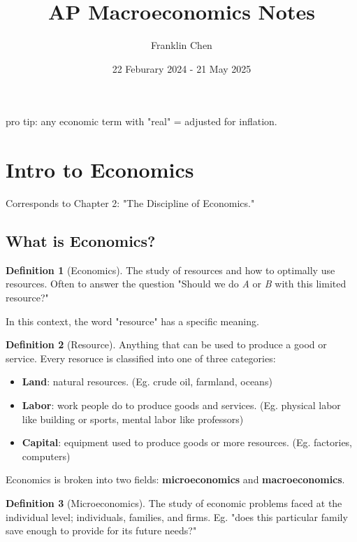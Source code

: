 \documentclass[12pt, a4paper]{article}
\title{AP Macroeconomics Notes}
\author{Franklin Chen}
\date{22 Feburary 2024 - 21 May 2025}
\theoremstyle{definition}
\newtheorem{definition}{Definition}
\begin{document}
\maketitle
\newpage

\tableofcontents

\newpage

pro tip: any economic term with "real" = adjusted for inflation.

\section{Intro to Economics}
Corresponds to Chapter 2: "The Discipline of Economics."

\subsection{What is Economics?}

\begin{definition}[Economics]
    The study of resources and how to optimally use resources.
    Often to answer the question "Should we do \textit{A} or \textit{B} with this limited resource?"
\end{definition}

In this context, the word "resource" has a specific meaning.

\begin{definition}[Resource]
    Anything that can be used to produce a good or service.
    Every resoruce is classified into one of three categories:
    \begin{itemize}
        \item \textbf{Land}: natural resources. (Eg. crude oil, farmland, oceans)
        \item \textbf{Labor}: work people do to produce goods and services. (Eg. physical labor like building or sports, mental labor like professors)
        \item \textbf{Capital}: equipment used to produce goods or more resources. (Eg. factories, computers)
    \end{itemize}
\end{definition}

Economics is broken into two fields: \textbf{microeconomics} and \textbf{macroeconomics}.

\begin{definition}[Microeconomics]
    The study of economic problems faced at the individual level; individuals, families, and firms.
    Eg. "does this particular family save enough to provide for its future needs?"
\end{definition}
\end{document}
